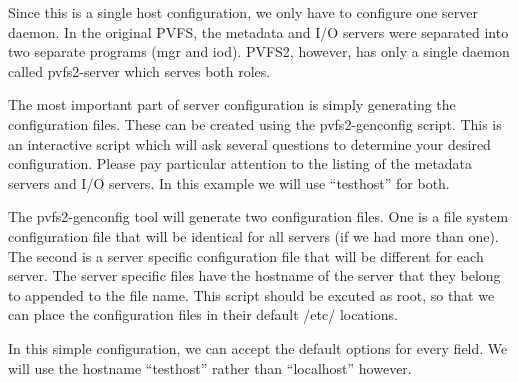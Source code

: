\documentclass[11pt, letterpaper]{article}
\begin{document}
Since this is a single host configuration, we only have to configure
one server daemon.  In the original PVFS, the metadata and I/O servers
were separated into two separate programs (mgr and iod).  PVFS2,
however, has only a single daemon called pvfs2-server which serves
both roles.

The most important part of server configuration is simply generating
the configuration files.  These can be created using the
pvfs2-genconfig script.  This is an interactive script which will ask
several questions to determine your desired configuration.  Please pay
particular attention to the listing of the metadata servers and I/O
servers.  In this example we will use ``testhost'' for both.

The pvfs2-genconfig tool will generate two configuration files.  One
is a file system configuration file that will be identical for all
servers (if we had more than one).  The second is a server specific
configuration file that will be different for each server.  The server
specific files have the hostname of the server that they belong to
appended to the file name.  This script should be excuted as root, so
that we can place the configuration files in their default /etc/
locations.

In this simple configuration, we can accept the default options for
every field.  We will use the hostname ``testhost'' rather than
``localhost'' however.
\end{document}
